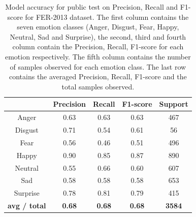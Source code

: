 \documentclass[master]{thesis-uestc}
\begin{document}
\begin{table}[ht]
\renewcommand{\arraystretch}{1.3}
\caption{Model accuracy for public test on Precision, Recall and F1-score for FER-2013 dataset. The first column contains the seven emotion classes (Anger, Disgust, Fear, Happy, Neutral, Sad and Surprise), the second, third and fourth column contain the Precision, Recall, F1-score for each emotion respectively. The fifth column contains the number of samples observed for each emotion class. The last row contains the averaged Precision, Recall, F1-score and the total samples observed.}
\label{table_fer2013_scores_public}
\begin{center}
\begin{tabular}{|c|c|c|c|c|}

\hline
 & Precision & Recall & F1-score & Support\\ \hline

Anger & 0.63 & 0.63 & 0.63 & 467\\ \hline
Disgust & 0.71 & 0.54 & 0.61 & 56\\ \hline
Fear & 0.56 & 0.46 & 0.51 & 496\\ \hline
Happy & 0.90 & 0.85 & 0.87 & 890\\ \hline
Neutral & 0.55 & 0.66 & 0.60 & 607\\ \hline
Sad & 0.58 & 0.58 & 0.58 & 653\\ \hline
Surprise & 0.78 & 0.81 & 0.79 & 415\\ \hline

\textbf{avg / total} & \textbf{0.68} & \textbf{0.68} & \textbf{0.68} & \textbf{3584}\\ \hline

\end{tabular}
\end{center}
\end{table}
\end{document}

